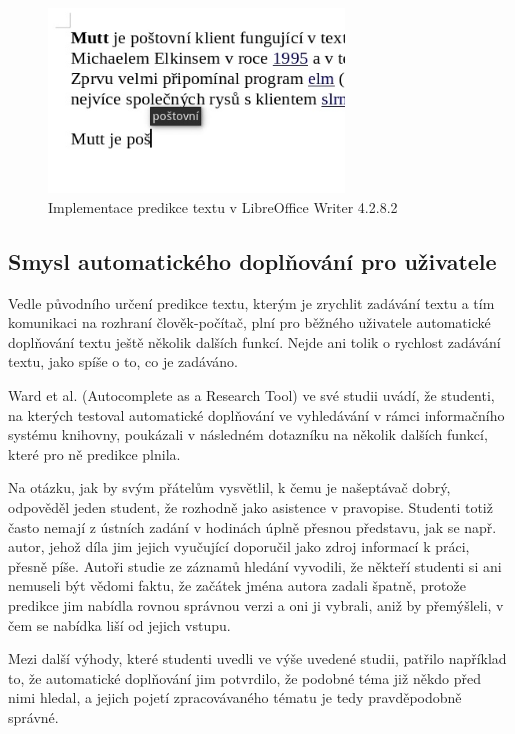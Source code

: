 \documentclass{article}
\begin{document}
\begin{figure}[h]
	\caption{Implementace predikce textu v LibreOffice Writer 4.2.8.2}
	\label{fig:LOpredict}
	\centering
	\includegraphics[width=0.7\textwidth]{LO_prediction_1}
\end{figure}

\subsection{Smysl automatického doplňování pro uživatele}

Vedle původního určení predikce textu, kterým je zrychlit zadávání textu a tím komunikaci na rozhraní člověk-počítač, plní pro běžného uživatele automatické doplňování textu ještě několik dalších funkcí. Nejde ani tolik o rychlost zadávání textu, jako spíše o to, co je zadáváno. 

Ward et al. (Autocomplete as a Research Tool) ve své studii uvádí, že studenti, na kterých testoval automatické doplňování ve vyhledávání v rámci informačního systému knihovny, poukázali v následném dotazníku na několik dalších funkcí, které pro ně predikce plnila. 

Na otázku, jak by svým přátelům vysvětlil, k čemu je našeptávač dobrý, odpověděl jeden student, že rozhodně jako asistence v pravopise. Studenti totiž často nemají z ústních zadání v hodinách úplně přesnou představu, jak se např. autor, jehož díla jim jejich vyučující doporučil jako zdroj informací k práci, přesně píše. Autoři studie ze záznamů hledání vyvodili, že někteří studenti si ani nemuseli být vědomi faktu, že začátek jména autora zadali špatně, protože predikce jim nabídla rovnou správnou verzi a oni ji vybrali, aniž by přemýšleli, v čem se nabídka liší od jejich vstupu. 

Mezi další výhody, které studenti uvedli ve výše uvedené studii, patřilo například to, že automatické doplňování jim potvrdilo, že podobné téma již někdo před nimi hledal, a jejich pojetí zpracovávaného tématu je tedy pravděpodobně správné. 
\end{document}
